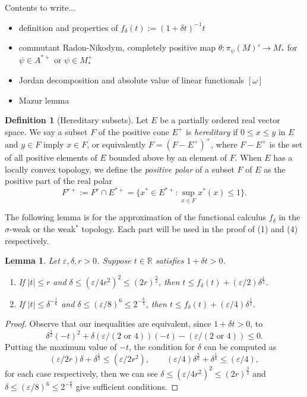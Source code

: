 \documentclass[noamsfonts,a4paper,10pt]{amsart}
\theoremstyle{plain}
\newtheorem{lem}[thm]{Lemma}
\theoremstyle{definition}
\newtheorem{defn}[thm]{Definition}
\theoremstyle{remark}
\begin{document}
Contents to write...
\begin{itemize}
\item definition and properties of $f_\delta(t):=(1+\delta t)^{-1}t$
\item commutant Radon-Nikodym, completely positive map $\theta:\pi_\psi(M)'\to M_*$ for $\psi\in A^{*+}$ or $\psi\in M_*^+$
\item Jordan decomposition and absolute value of linear functionals $[\omega]$
\item Mazur lemma
\end{itemize}


\begin{defn}[Hereditary subsets]
Let $E$ be a partially ordered real vector space.
We say a subset $F$ of the positive cone $E^+$ is \emph{hereditary} if $0\le x\le y$ in $E$ and $y\in F$ imply $x\in F$, or equivalently $F=(F-E^+)^+$, where $F-E^+$ is the set of all positive elements of $E$ bounded above by an element of $F$.
When $E$ has a locally convex topology, we define the \emph{positive polar} of a subset $F$ of $E$ as the positive part of the real polar
\[F^{r+}:=F^r\cap E^{*+}=\{x^*\in E^{*+}:\sup_{x\in F}x^*(x)\le1\}.\]
\end{defn}

The following lemma is for the approximation of the functional calculus $f_\delta$ in the $\sigma$-weak or the weak$^*$ topology.
Each part will be used in the proof of (1) and (4) respectively.
\begin{lem}
Let $\varepsilon,\delta,r>0$.
Suppose $t\in\mathbb{R}$ satisfies $1+\delta t>0$.
\begin{enumerate}
\item If $|t|\le r$ and $\delta\le(\varepsilon/4r^2)^2\le(2r)^{\frac32}$, then $t\le f_\delta(t)+(\varepsilon/2)\delta^{\frac12}$.
\item If $|t|\le\delta^{-\frac16}$ and $\delta\le(\varepsilon/8)^6\le2^{-\frac65}$, then $t\le f_\delta(t)+(\varepsilon/4)\delta^{\frac12}$.
\end{enumerate}
\end{lem}
\begin{proof}
Observe that our inequalities are equivalent, since $1+\delta t>0$, to
\[\delta^{\frac12}(-t)^2+\delta(\varepsilon/(2\text{ or }4))(-t)-(\varepsilon/(2\text{ or }4))\le0.\]
Putting the maximum value of $-t$, the condition for $\delta$ can be computed as
\[(\varepsilon/2r)\delta+\delta^{\frac12}\le(\varepsilon/2r^2),\qquad(\varepsilon/4)\delta^{\frac56}+\delta^{\frac16}\le(\varepsilon/4),\]
for each case respectively, then we can see $\delta\le(\varepsilon/4r^2)^2\le(2r)^{\frac32}$ and $\delta\le(\varepsilon/8)^6\le2^{-\frac65}$ give sufficient conditions.
\end{proof}
\end{document}
